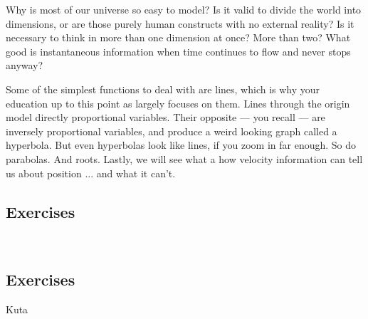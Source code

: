 

Why is most of our universe so easy to model?  
Is it valid to divide the world into dimensions,
or are those purely human constructs with no external reality?  
Is it necessary to think in more 
than one dimension at once?  More than two?  
What good is instantaneous information when 
time continues to flow and never stops anyway?

Some of the simplest functions to deal with are lines, which is why your education
up to this point as largely focuses on them.  Lines through the origin model directly
proportional variables.  Their opposite --- you recall --- are inversely proportional
variables, and produce a weird looking graph called a hyperbola.  But even hyperbolas
look like lines, if you zoom in far enough.  So do parabolas.  And roots.  Lastly,
we will see what a how velocity information can tell us about position ...
and what it can't.

\newpage
\chapterminitoc


\newpage
{}

\newpage

\newpage
\subsection{Exercises}





\newpage
{}

\newpage

~\vfill
\newpage
\subsection{Exercises}
Kuta






